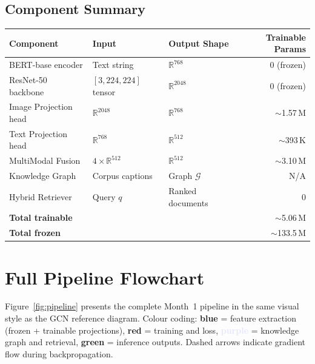\documentclass[12pt, a4paper]{article}
\theoremstyle{definition}
\theoremstyle{plain}
\theoremstyle{remark}
\begin{document}
\subsection{Component Summary}

\begin{center}
\renewcommand{\arraystretch}{1.2}
\begin{tabular}{@{}lllr@{}}
\toprule
\textbf{Component} & \textbf{Input} & \textbf{Output Shape} &
\textbf{Trainable Params} \\
\midrule
BERT-base encoder       & Text string           & $\mathbb{R}^{768}$      & 0 (frozen) \\
ResNet-50 backbone      & $[3,224,224]$ tensor  & $\mathbb{R}^{2048}$     & 0 (frozen) \\
Image Projection head   & $\mathbb{R}^{2048}$   & $\mathbb{R}^{768}$      & $\sim$1.57\,M \\
Text Projection head    & $\mathbb{R}^{768}$    & $\mathbb{R}^{512}$      & $\sim$393\,K  \\
MultiModal Fusion       & $4\times\mathbb{R}^{512}$ & $\mathbb{R}^{512}$  & $\sim$3.10\,M \\
Knowledge Graph         & Corpus captions       & Graph $\mathcal{G}$     & N/A \\
Hybrid Retriever        & Query $q$             & Ranked documents        & 0 \\
\midrule
\textbf{Total trainable} & & & $\sim$5.06\,M \\
\textbf{Total frozen}    & & & $\sim$133.5\,M \\
\bottomrule
\end{tabular}
\end{center}

\section{Full Pipeline Flowchart}
\label{sec:flowchart}

Figure~\ref{fig:pipeline} presents the complete Month~1 pipeline in the
same visual style as the GCN reference diagram.  Colour coding:
\textcolor{NavyBlue}{\textbf{blue}} = feature extraction (frozen + trainable projections),
\textcolor{CoralRed}{\textbf{red}} = training and loss,
\textcolor{Lavender}{\textbf{purple}} = knowledge graph and retrieval,
\textcolor{MintGreen}{\textbf{green}} = inference outputs.
Dashed arrows indicate gradient flow during backpropagation.
\end{document}
